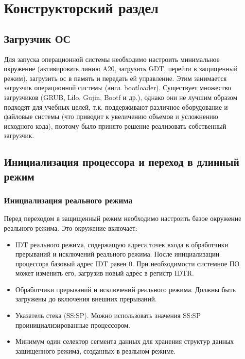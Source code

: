 \chapter{Конструкторский раздел}
\label{cha:design}



\section{Загрузчик ОС}
Для запуска операционной системы необходимо настроить минимальное окружение (активировать линию A20,
загрузить GDT, перейти в защищенный режим), загрузить ос в память и передать ей управление.
Этим занимается загрузчик операционной системы (англ. bootloader). Существует множество загрузчиков
(GRUB, Lilo, Gujin, Bootf и др.), однако они не лучшим образом подходят для учебных целей, т.к. поддерживают
различное оборудование и файловые системы (что приводит к увеличению объемов и усложнению исходного кода),
поэтому было принято решение реализовать собственный загрузчик.


\section{Инициализация процессора и переход в длинный режим}
\label{sec:long_mode_activation}

\subsection{Инициализация реального режима}
Перед переходом в защищенный режим необходимо настроить базое окружение
реального режима. Это окружение включает:
\begin{itemize}
\item IDT реального режима, содержащую адреса точек входа в обработчики прерываний
	и исключений реального режима. После инициализации процессора базовый адрес IDT
	равен 0. При необходимости системное ПО может изменить его, загрузив новый адрес
	в регистр IDTR.
\item Обработчики прерываний и исключений реального режима. Должны быть загружены до
	включения внешних прерываний.
\item Указатель стека (SS:SP). Можно использовать значения SS:SP проинициализированные процессором.
\item Минимум один селектор сегмента данных для хранения структур данных защищенного режима,
	созданных в реальном режиме.
\end{itemize}

